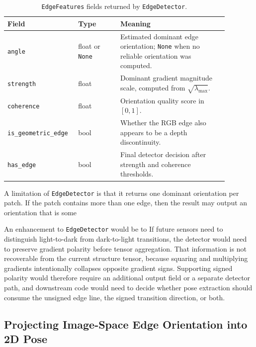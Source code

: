 \documentclass{article}
\begin{document}
\begin{table}[ht]
  \centering
  \begin{tabular}{p{0.24\linewidth} p{0.18\linewidth} p{0.46\linewidth}}
    \hline
    Field & Type & Meaning \\
    \hline
    \texttt{angle} & float or \texttt{None} & Estimated dominant edge orientation; \texttt{None} when no reliable orientation was computed. \\
    \texttt{strength} & float & Dominant gradient magnitude scale, computed from $\sqrt{\lambda_{\max}}$. \\
    \texttt{coherence} & float & Orientation quality score in $[0, 1]$. \\
    \texttt{is\_geometric\_edge} & bool & Whether the RGB edge also appears to be a depth discontinuity. \\
    \texttt{has\_edge} & bool & Final detector decision after strength and coherence thresholds. \\
    \hline
  \end{tabular}
  \caption{\texttt{EdgeFeatures} fields returned by \texttt{EdgeDetector}.}
  \label{tab:edge-features}
\end{table}

A limitation of \texttt{EdgeDetector} is that it returns one dominant orientation per patch. If the patch contains more than one edge, then the result may output an orientation that is some 


An enhancement to \texttt{EdgeDetector} would be to 
If future sensors need to distinguish light-to-dark from dark-to-light transitions, the detector would need to preserve gradient polarity before tensor aggregation.
That information is not recoverable from the current structure tensor, because squaring and multiplying gradients intentionally collapses opposite gradient signs.
Supporting signed polarity would therefore require an additional output field or a separate detector path, and downstream code would need to decide whether pose extraction should consume the unsigned edge line, the signed transition direction, or both.

\subsection{Projecting Image-Space Edge Orientation into 2D Pose}
\end{document}
